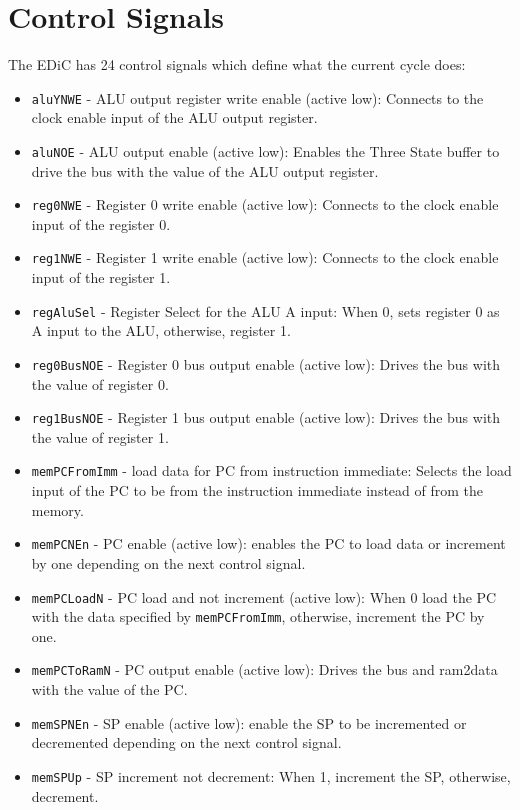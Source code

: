 \section{Control Signals}\label{sec:controlSignals}
The \gls{EDiC} has 24 control signals which define what the current cycle does:
\begin{itemize}
  \item \texttt{aluYNWE} - \gls{ALU} output register write enable (active low): Connects to the clock enable input of the \gls{ALU} output register.
  \item \texttt{aluNOE} - \gls{ALU} output enable (active low): Enables the Three State buffer to drive the bus with the value of the \gls{ALU} output register.
  \item \texttt{reg0NWE} - Register 0 write enable (active low): Connects to the clock enable input of the register 0.
  \item \texttt{reg1NWE} - Register 1 write enable (active low): Connects to the clock enable input of the register 1.
  \item \texttt{regAluSel} - Register Select for the \gls{ALU} A input: When 0, sets register 0 as A input to the \gls{ALU}, otherwise, register 1.
  \item \texttt{reg0BusNOE} - Register 0 bus output enable (active low): Drives the bus with the value of register 0.
  \item \texttt{reg1BusNOE} - Register 1 bus output enable (active low): Drives the bus with the value of register 1.
  \item \texttt{memPCFromImm} - load data for \gls{PC} from instruction immediate: Selects the load input of the \gls{PC} to be from the instruction immediate instead of from the memory.
  \item \texttt{memPCNEn} - \gls{PC} enable (active low): enables the \gls{PC} to load data or increment by one depending on the next control signal.
  \item \texttt{memPCLoadN} - \gls{PC} load and not increment (active low): When 0 load the \gls{PC} with the data specified by \texttt{memPCFromImm}, otherwise, increment the \gls{PC} by one.
  \item \texttt{memPCToRamN} - \gls{PC} output enable (active low): Drives the bus and ram2data with the value of the \gls{PC}.
  \item \texttt{memSPNEn} - \gls{SP} enable (active low): enable the \gls{SP} to be incremented or decremented depending on the next control signal.
  \item \texttt{memSPUp} - \gls{SP} increment not decrement: When 1, increment the \gls{SP}, otherwise, decrement.

\end{itemize}

